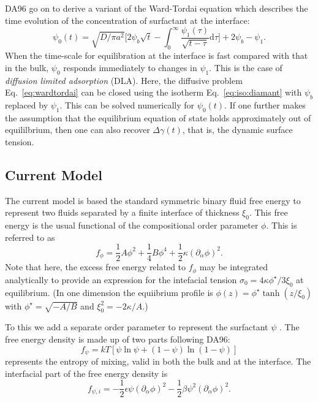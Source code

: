 DA96 go on to derive a variant of the Ward-Tordai equation \cite{wardtordai}
which describes the time evolution of the concentration of surfactant
at the interface:
\begin{equation}
\psi_0 (t) = \sqrt{D/\pi a^2}
\Bigg[ 2\psi_b \sqrt{t} 
- \int_0^\infty \frac{\psi_1 (\tau)}{\sqrt{t - \tau}} \mathrm{d}\tau \Bigg]
+ 2\psi_b - \psi_1.
\label{eq:wardtordai}
\end{equation}
When the time-scale for equilibration at the interface is fast compared
with that in the bulk, $\psi_0$ responds immediately to changes in
$\psi_1$. This is the case of \textit{diffusion limited adsorption} (DLA).
Here, the diffusive problem Eq.~\ref{eq:wardtordai} can be closed
using the isotherm Eq.~\ref{eq:iso:diamant} with $\psi_b$ replaced by
$\psi_1$. This can be solved numerically for $\psi_0 (t)$. If one further
makes the assumption that the equilibrium equation of state holds
approximately out of equililbrium, then one can also recover
$\Delta\gamma (t)$, that is, the dynamic surface tension.

\subsection{Current Model}

The current model is based the standard symmetric binary fluid
free energy to represent two fluids separated by a finite
interface of thickness $\xi_0$. This free energy is the usual
functional of the compositional order parameter $\phi$. This is
referred to as
\begin{equation}
f_\phi = {\textstyle\frac{1}{2}}A\phi^2
+ {\textstyle\frac{1}{4}}B\phi^4
+ {\textstyle\frac{1}{2}}\kappa (\partial_\alpha \phi)^2.
\end{equation}
Note that here, the excess free energy related to $f_\phi$ may
be integrated analytically to provide an expression for the
intefacial tension $\sigma_0 = 4\kappa\phi^\star/3\xi_0$ at
equilibrium.
(In one dimension the equiibrium profile
is $\phi(z) = \phi^\star \tanh(z/\xi_0)$ with $\phi^\star = \sqrt{-A/B}$
and $\xi_0^2 = -2\kappa/A$.)

To this we add a separate order parameter to represent the
surfactant $\psi$ \cite{vandergraaf}. The free energy density
is made up of two parts following DA96:
\begin{equation}
f_{\psi} = kT[\psi\ln\psi  + (1 - \psi) \ln (1 - \psi)]
\end{equation}
represents the entropy of mixing, valid in both the bulk and at
the interface. The interfacial part of the free energy density is
\begin{equation}
f_{\psi,i} = -{\textstyle\frac{1}{2}}\epsilon\psi (\partial_\alpha \phi)^2
- {\textstyle\frac{1}{2}} \beta \psi^2 (\partial_\alpha \phi)^2.
\end{equation}

